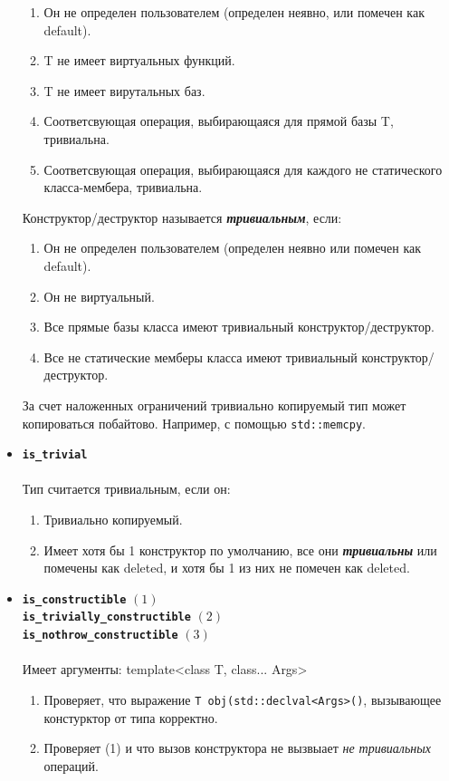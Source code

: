 \begin{itemize}
\begin{enumerate}
\item Он не определен пользователем (определен неявно, или помечен как default).
\item T не имеет виртуальных функций.
\item T не имеет вирутальных баз.
\item Соответсвующая операция, выбирающаяся для прямой базы T, тривиальна.
\item Соответсвующая операция, выбирающаяся для каждого не статического класса-мембера, тривиальна.
\end{enumerate}
Конструктор/деструктор называется \textbf{\textit{тривиальным}}, если:
\begin{enumerate}
	\item Он не определен пользователем (определен неявно или помечен как default).
	\item Он не виртуальный.
	\item Все прямые базы класса имеют тривиальный конструктор/деструктор.
	\item Все не статические мемберы класса имеют тривиальный конструктор/деструктор.
\end{enumerate}
За счет наложенных ограничений тривиально копируемый тип может копироваться побайтово. Например, с помощью \texttt{std::memcpy}.
\item \textbf{\texttt{is\_trivial}} \\\\
Тип считается тривиальным, если он:
\begin{enumerate}
\item Тривиально копируемый.
\item Имеет хотя бы 1 конструктор по умолчанию, все они \textbf{\textit{тривиальны}} или помечены как deleted,
и хотя бы 1 из них не помечен как deleted.
\end{enumerate}
\item \texttt{\textbf{is\_constructible}} $(1)$\\
		\texttt{\textbf{is\_trivially\_constructible}} $(2)$\\
		\texttt{\textbf{is\_nothrow\_constructible}} $(3)$\\\\
Имеет аргументы: template<class T, class... Args>
\begin{enumerate}
\item Проверяет, что выражение \texttt{T obj(std::declval<Args>()}, вызывающее констурктор от типа корректно.
\item Проверяет (1) и что вызов конструктора не вызвыает \textit{не тривиальных} операций.

\end{enumerate}
\end{itemize}
